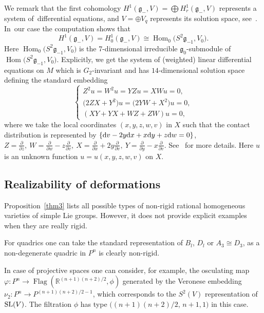 \documentclass[10pt,a4paper]{amsart}
\newcommand{\R}{\mathbb R}
\newcommand{\g}{\mathfrak g}
\newcommand{\Flag}{\operatorname{Flag}}
\newcommand{\Hom}{\operatorname{Hom}}
\numberwithin{equation}{section}
\begin{document}
We remark that the first cohomology $H^1(\g_{-},V) =\bigoplus H^1_{r}(\g_{-},V)$ represents a system of~differential equations, and $V=\oplus V_{q}$ represents its solution space, see~\cite{Mor2006}. In~our case the computation shows that
\[
H^1(\g_{-},V)=H^1_{0}(\g_{-},V)\cong \Hom_{0}\big(S^2\g_{-1},V_0\big).
\]
Here $\Hom_{0}\big(S^2\g_{-1},V_0\big)$ is the 7-dimensional irreducible $\g_{0}$-submodule of $\Hom\big(S^2\g_{-1},V_{0}\big)$. Exp\-li\-citly, we get the system of (weighted) linear differential equations on $M$ which is $G_2$-invariant and has $14$-dimensional solution space defining the standard embedding
\[
\begin{cases}
Z^2u = W^2u = YZu = XWu =0, \\
\big(2ZX+Y^2\big)u = \big(2YW+X^2\big)u =0, \\
(XY+YX+WZ+ZW)u =0,
\end{cases}
\]
where we take the local coordinates $(x,y,z,w,v)$ in $X$ such that
the contact distribution is represented by $\{ {\rm d}v-2y{\rm d}x+x{\rm d}y+z{\rm d}w=0 \}$, \
$Z=\frac{\partial}{\partial z},\ W=\frac{\partial}{\partial w}-z\frac{\partial}{\partial v},\
X=\frac{\partial}{\partial x}+2y\frac{\partial}{\partial v},\
Y=\frac{\partial}{\partial y}-x\frac{\partial}{\partial v}$.
See~\cite{IMT} for more details. Here
$u$ is an unknown function $u=u(x,y,z,w,v)$ on $X$.


\subsection{Realizability of deformations}
Proposition~\ref{thm3} lists all possible types of non-rigid rational homogeneous varieties of simple Lie groups. However, it does not provide explicit examples when they are really rigid.

For quadrics one can take the standard representation of $B_l$, $D_l$ or $A_3\cong D_3$, as a non-degenerate quadric in $P^n$ is clearly non-rigid.

In case of projective spaces one can consider, for example, the osculating map $\varphi\colon P^n\to \Flag\left(\R^{(n+1)(n+2)/2},\phi\right)$ generated by the Veronese embedding $\nu_2\colon P^n\to P^{(n+1)(n+2)/2-1}$, which corresponds to the $S^2(V)$ representation of ${\rm SL}(V)$. The filtration $\phi$ has type $((n+1)(n+2)/2$, $n+1,1)$ in this case.
\end{document}
